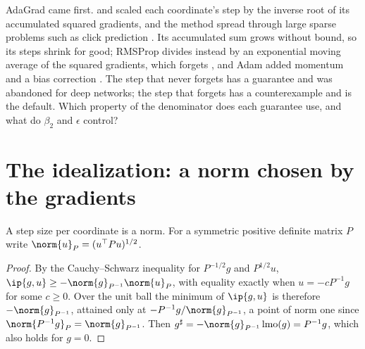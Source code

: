 \begin{refsection}
AdaGrad came first. \Textcite{McMahanStreeter2010} and \textcite{DuchiHazanSinger2011} scaled each coordinate's step by the inverse root of its accumulated squared gradients, and the method spread through large sparse problems such as click prediction \parencite{McMahanEtAl2013}. Its accumulated sum grows without bound, so its steps shrink for good; RMSProp divides instead by an exponential moving average of the squared gradients, which forgets \parencite{TielemanHinton2012}, and Adam added momentum and a bias correction \parencite{KingmaBa2015}. The step that never forgets has a guarantee and was abandoned for deep networks; the step that forgets has a counterexample and is the default. Which property of the denominator does each guarantee use, and what do $\beta_2$ and $\epsilon$ control?

\section{The idealization: a norm chosen by the gradients}\label{sec:adaptive:idealization}

A step size per coordinate is a norm. For a symmetric positive definite matrix $P$ write $\norm{u}_P=(u^\top Pu)^{1/2}$.


\begin{proof}
By the Cauchy--Schwarz inequality for $P^{-1/2}g$ and $P^{1/2}u$, $\ip{g,u}\ge-\norm{g}_{P^{-1}}\norm{u}_P$, with equality exactly when $u=-cP^{-1}g$ for some $c\ge0$. Over the unit ball the minimum of $\ip{g,u}$ is therefore $-\norm{g}_{P^{-1}}$, attained only at $-P^{-1}g/\norm{g}_{P^{-1}}$, a point of norm one since $\norm{P^{-1}g}_P=\norm{g}_{P^{-1}}$. Then $g^\sharp=-\norm{g}_{P^{-1}}\lmo(g)=P^{-1}g$, which also holds for $g=0$.
\end{proof}


\end{refsection}

